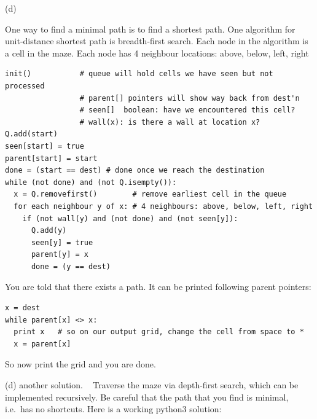 \documentclass[12pt]{article}
\begin{document}
\newpage
{}(d) ~

One way to find a minimal path is to find a shortest path.
One algorithm for unit-distance shortest path is breadth-first search.
Each node in the algorithm is a cell in the maze.
Each node has 4 neighbour locations: above, below, left, right

\begin{verbatim}
init()           # queue will hold cells we have seen but not processed
                 # parent[] pointers will show way back from dest'n
                 # seen[]  boolean: have we encountered this cell?
                 # wall(x): is there a wall at location x?
Q.add(start)
seen[start] = true
parent[start] = start  
done = (start == dest) # done once we reach the destination
while (not done) and (not Q.isempty()):
  x = Q.removefirst()        # remove earliest cell in the queue
  for each neighbour y of x: # 4 neighbours: above, below, left, right
    if (not wall(y) and (not done) and (not seen[y]): 
      Q.add(y)
      seen[y] = true
      parent[y] = x
      done = (y == dest)
\end{verbatim}

You are told that there exists a path.
It can be printed following parent pointers:

\begin{verbatim}
x = dest
while parent[x] <> x:
  print x   # so on our output grid, change the cell from space to *
  x = parent[x]
\end{verbatim}

So now print the grid and you are done.

\newpage
{}(d) another solution. ~
Traverse the maze via depth-first search,
which can be implemented recursively. Be careful that the path
that you find is minimal, i.e.\ has no shortcuts.
Here is a working python3 solution:
\end{document}
